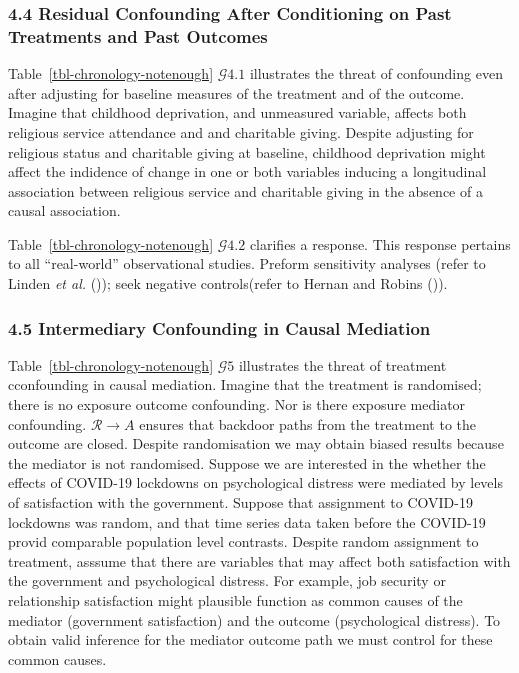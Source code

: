 \documentclass[
  single column]{article}
\begin{document}
\subsubsection{4.4 Residual Confounding After Conditioning on Past
Treatments and Past
Outcomes}\label{residual-confounding-after-conditioning-on-past-treatments-and-past-outcomes}

Table~\ref{tbl-chronology-notenough} \(\mathcal{G} 4.1\) illustrates the
threat of confounding even after adjusting for baseline measures of the
treatment and of the outcome. Imagine that childhood deprivation, and
unmeasured variable, affects both religious service attendance and and
charitable giving. Despite adjusting for religious status and charitable
giving at baseline, childhood deprivation might affect the indidence of
change in one or both variables inducing a longitudinal association
between religious service and charitable giving in the absence of a
causal association.

Table~\ref{tbl-chronology-notenough} \(\mathcal{G} 4.2\) clarifies a
response. This response pertains to all ``real-world'' observational
studies. Preform sensitivity analyses (refer to Linden \emph{et al.}
()); seek negative controls(refer
to Hernan and Robins ()).

\subsubsection{4.5 Intermediary Confounding in Causal
Mediation}\label{intermediary-confounding-in-causal-mediation}

Table~\ref{tbl-chronology-notenough} \(\mathcal{G} 5\) illustrates the
threat of treatment cconfounding in causal mediation. Imagine that the
treatment is randomised; there is no exposure outcome confounding. Nor
is there exposure mediator confounding. \(\mathcal{R} \to A\) ensures
that backdoor paths from the treatment to the outcome are closed.
Despite randomisation we may obtain biased results because the mediator
is not randomised. Suppose we are interested in the whether the effects
of COVID-19 lockdowns on psychological distress were mediated by levels
of satisfaction with the government. Suppose that assignment to COVID-19
lockdowns was random, and that time series data taken before the
COVID-19 provid comparable population level contrasts. Despite random
assignment to treatment, asssume that there are variables that may
affect both satisfaction with the government and psychological distress.
For example, job security or relationship satisfaction might plausible
function as common causes of the mediator (government satisfaction) and
the outcome (psychological distress). To obtain valid inference for the
mediator outcome path we must control for these common causes.
\end{document}
